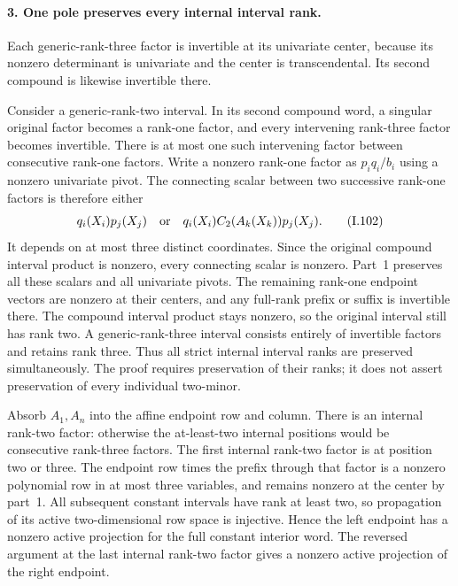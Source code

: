 \paragraph{3. One pole preserves every internal interval rank.}
Each generic-rank-three factor is invertible at its univariate
center, because its nonzero determinant is univariate and the
center is transcendental. Its second compound is likewise
invertible there.

Consider a generic-rank-two interval. In its second compound
word, a singular original factor becomes a rank-one factor,
and every intervening rank-three factor becomes invertible.
There is at most one such intervening factor between consecutive
rank-one factors. Write a nonzero rank-one factor as $p_iq_i/b_i$
using a nonzero univariate pivot. The connecting scalar between
two successive rank-one factors is therefore either
\[
 q_i(X_i)p_j(X_j)
 \quad\hbox{or}\quad
 q_i(X_i)C_2(A_k(X_k))p_j(X_j).
 \tag{I.102}
\]
It depends on at most three distinct coordinates. Since the
original compound interval product is nonzero, every connecting
scalar is nonzero. Part~1 preserves all these scalars and all
univariate pivots. The remaining rank-one endpoint vectors are
nonzero at their centers, and any full-rank prefix or suffix is
invertible there. The compound interval product stays nonzero,
so the original interval still has rank two. A generic-rank-three
interval consists entirely of invertible factors and retains
rank three. Thus all strict internal interval ranks are preserved
simultaneously. The proof requires preservation of their ranks;
it does not assert preservation of every individual two-minor.

Absorb $A_1,A_n$ into the affine endpoint row and column. There
is an internal rank-two factor: otherwise the at-least-two
internal positions would be consecutive rank-three factors.
The first internal rank-two factor is at position two or three.
The endpoint row times the prefix through that factor is a
nonzero polynomial row in at most three variables, and remains
nonzero at the center by part~1. All subsequent constant
intervals have rank at least two, so propagation of its active
two-dimensional row space is injective. Hence the left endpoint
has a nonzero active projection for the full constant interior
word. The reversed argument at the last internal rank-two
factor gives a nonzero active projection of the right endpoint.

